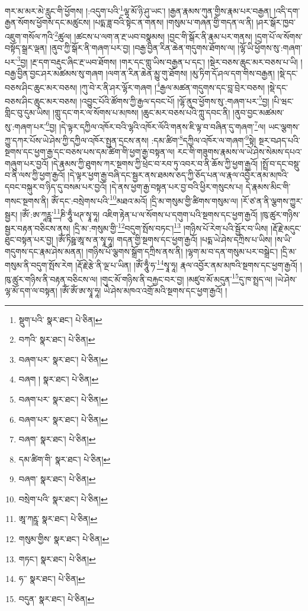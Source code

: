 གར་མ་མར་མེ་རླུང་གི་ཕྱོགས། །:འདུག་པའི་\footnote{སྡུག་པའི་  སྣར་ཐང་།  པེ་ཅིན། }ལྷ་མོ་ཉི་ཤུ་ཡང་། །རྒྱན་རྣམས་ཀུན་གྱིས་རྣམ་པར་བརྒྱན། །འདི་དག་རྒྱན་སོགས་ཕྱོགས་དང་མཚུངས། །པདྨ་ཟླ་བའི་སྟེང་ན་གནས། །གསུམ་པ་གཞན་གྱི་གདན་ལ་ནི། །ཤར་སྒོར་ཁྱབ་འཇུག་གསོལ་ཀའི་\footnote{བཀའི་  སྣར་ཐང་།  པེ་ཅིན། }ཚུལ། །ཚངས་པ་ལག་ན་རྔ་ཡབ་བསྣམས། །བྱང་གི་སྒོར་ནི་རྣམ་པར་གནས། །དྲག་པོ་ལ་སོགས་བསྟོད་སྒྲར་ལྡན། །ནུབ་ཀྱི་སྒོར་ནི་གཞག་པར་བྱ། །བརྒྱ་བྱིན་རིན་ཆེན་གདུགས་ཐོགས་ལ། །ལྷོ་ཡི་ཕྱོགས་སུ་:གཞག་པར་\footnote{བཞག་པར་  སྣར་ཐང་།  པེ་ཅིན། }བྱ། །རྔ་དག་བརྡུང་ཞིང་རྔ་ཡབ་ཐོགས། །གར་དང་གླུ་ཡིས་བརྒྱན་པ་དང་། །སྡེར་བཅས་ཆུང་མར་བཅས་པ་ཡི། །བརྒྱ་བྱིན་བྱང་ཤར་མཚམས་སུ་གཞག །ལག་ན་རིན་ཆེན་མྱུ་གུ་ཐོགས། །མུ་ཏིག་དོ་ཤལ་དག་གིས་བརྒྱན། །སྡེ་དང་བཅས་ཤིང་ཆུང་མར་བཅས། །ཀུ་བེ་ར་ནི་ཤར་ལྷོར་གཞག །\footnote{བཞག །  སྣར་ཐང་།  པེ་ཅིན། }རྒྱལ་མཚན་གདུགས་དང་བླ་བྲེར་བཅས། །སྡེ་དང་བཅས་ཤིང་ཆུང་མར་བཅས། །འབྱུང་པོའི་ཚོགས་ཀྱི་རྒྱལ་དབང་པོ། །ལྷོ་ནུབ་ཕྱོགས་སུ་:གཞག་པར་\footnote{བཞག་པར་  སྣར་ཐང་།  པེ་ཅིན། }བྱ། །པི་ཝང་གླིང་བུ་དུམ་ཡིས། །གླུ་དང་གར་ལ་སོགས་པ་མཁས། །ཆུང་མར་བཅས་པའི་ཀླུ་དབང་ནི། །ནུབ་བྱང་མཚམས་སུ་:གཞག་པར་\footnote{བཞག་པར་  སྣར་ཐང་།  པེ་ཅིན། }བྱ། །དེ་ལྟར་དཀྱིལ་འཁོར་བའི་ལྷའི་འཁོར་ལོའི་གནས་ཇི་ལྟ་བ་བཞིན་དུ་གཞག་\footnote{བཞག་  སྣར་ཐང་།  པེ་ཅིན། }ལ། ཡང་ལྕགས་ཀྱུ་དཀར་པོས་ཡེ་ཤེས་ཀྱི་དཀྱིལ་འཁོར་སྤྱན་དྲངས་ནས། :དམ་ཚིག་\footnote{དམ་ཚིག་གི་  སྣར་ཐང་།  པེ་ཅིན། }དཀྱིལ་འཁོར་ལ་གཞག་\footnote{བཞག་  སྣར་ཐང་།  པེ་ཅིན། }སྟེ། སྔར་བཤད་པའི་སྔགས་དང་ཕྱག་རྒྱ་དང་བཅས་པས་དམ་ཚིག་གི་ཕྱག་རྒྱ་བསྟན་ལ། རང་གི་གཟུགས་རྣམས་ལ་ཡེ་ཤེས་སེམས་དཔའ་གཞུག་པར་བྱའོ། །དེ་རྣམས་ཀྱི་ཐུགས་ཀར་སྔགས་ཀྱི་ཕྲེང་བ་རབ་ཏུ་འབར་བ་ནི་ཆོས་ཀྱི་ཕྱག་རྒྱའོ། །སྤྲོ་བ་དང་བསྡུ་བ་ནི་ལས་ཀྱི་ཕྱག་རྒྱའོ། །དེ་ལྟར་ཕྱག་རྒྱ་བཞི་དང་སྦྱར་ནས་ཐམས་ཅད་ཀྱི་ཅོད་པན་ལ་རྣལ་འབྱོར་ནམ་མཁའི་དབང་བསྐུར་བ་ཉིད་དུ་བསམ་པར་བྱའོ། །དེ་ནས་ཕྱག་རྒྱ་བསྟན་པར་བྱ་བའི་ཕྱིར་གསུངས་པ། དེ་རྣམས་མིང་གི་གསང་སྔགས་ནི། ཨོཾ་དང་:བསྲེགས་པའི་\footnote{བསྲེག་པའི་  སྣར་ཐང་།  པེ་ཅིན། }མཐའ་མའོ། །དྲི་མ་གསུམ་གྱི་ཚིགས་གསུམ་ལ། །རོ་ཙ་ན་ནི་ལྕགས་ཀྱུར་སྦྱར། །ཨོཾ་:ཨ་ཀཱཪྵཱ་\footnote{ཨཱ་ཀརྵཱ་  སྣར་ཐང་།  པེ་ཅིན། }ཎི་ཧཱུྃ་ཕཊ་སྭཱ་ཧཱ། འཇིག་རྟེན་པ་ལ་སོགས་པ་དགུག་པའི་སྔགས་དང་ཕྱག་རྒྱའོ། །ཁུ་ཚུར་གཉིས་སྦྱར་བརྟན་བཅིངས་ནས། །དྲི་མ་:གསུམ་གྱི་\footnote{གསུམ་གྱིས་  སྣར་ཐང་།  པེ་ཅིན། }བདུག་སྤོས་བཏང་།\footnote{གཏང་།  སྣར་ཐང་།  པེ་ཅིན། } །གཉིས་པོ་རེག་པའི་སྦྱོར་བ་ཡིས། །རྡོ་རྗེ་མདུང་ཐུང་བསྟན་པར་བྱ། །ཨོཾ་ཏིཥྛ་ཨཱ་ས་ན་སྭཱ་ཧཱ། གདན་གྱི་སྔགས་དང་ཕྱག་རྒྱའོ། །པདྨ་ཡེ་ཤེས་དཀྲིས་པ་ཡིས། །ས་ཡི་གདུགས་དང་རྣམ་ཤེས་མནན། །གཉིས་པོ་ལྕགས་སྒྲོག་དཀྲིས་ནས་ནི། །ལྷག་མ་བ་དན་གསུམ་པར་བསྒྲེང་། །དྲི་མ་གསུམ་ནི་བདུག་སྤོས་རེག །རྡོ་རྗེ་རྩེ་ནི་ལྔ་པ་ཡིན། །ཨོཾ་ཧཱུྃ་ཧ་\footnote{ཧ་་  སྣར་ཐང་།  པེ་ཅིན། }སྭཱ་ཧཱ། རྣལ་འབྱོར་ནམ་མཁའི་སྔགས་དང་ཕྱག་རྒྱའོ། །ཁུ་ཚུར་གཉིས་ནི་བརྟན་བཅིངས་ལ། །གུང་མོ་གཉིས་ནི་བརྐྱང་བར་བྱ། །མཛུབ་མོ་མདུན་\footnote{བདུན་  སྣར་ཐང་།  པེ་ཅིན། }དུ་ཁ་སྤྲད་ལ། །ཡེ་ཤེས་ལྷ་མོ་དག་ལ་བསྟན། །ཨོཾ་ཨོཾ་ཨ་སྭཱ་ཧཱ། ཡེ་ཤེས་མཁའ་འགྲོ་མའི་སྔགས་དང་ཕྱག་རྒྱའོ། །
